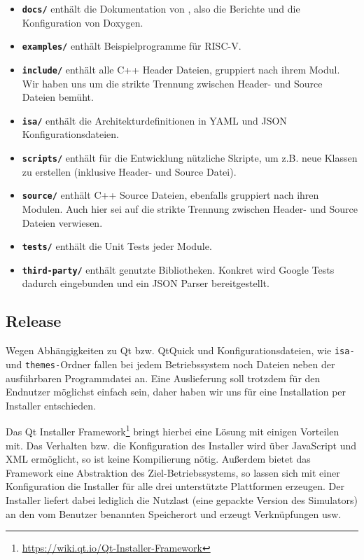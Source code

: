 \begin{itemize}
	\item \textbf{\texttt{docs/}} enthält die Dokumentation von \erasim{}, also
	die Berichte und die Konfiguration von Doxygen.
	\item \textbf{\texttt{examples/}} enthält Beispielprogramme für RISC-V.
	\item \textbf{\texttt{include/}} enthält alle C++ Header Dateien, gruppiert
	nach ihrem Modul. Wir haben uns um die strikte Trennung zwischen Header- und
	Source Dateien bemüht.
	\item \textbf{\texttt{isa/}} enthält die Architekturdefinitionen in YAML und
	JSON Konfigurationsdateien.
	\item \textbf{\texttt{scripts/}} enthält für die Entwicklung nützliche
	Skripte, um z.B. neue Klassen zu erstellen (inklusive Header- und
	Source Datei).
	\item \textbf{\texttt{source/}} enthält C++ Source Dateien, ebenfalls
	gruppiert nach ihren Modulen. Auch hier sei auf die strikte Trennung
	zwischen Header- und Source Dateien verwiesen.
	\item \textbf{\texttt{tests/}} enthält die Unit Tests jeder Module.
	\item \textbf{\texttt{third-party/}} enthält genutzte Bibliotheken. Konkret
	wird Google Tests dadurch eingebunden und ein JSON Parser bereitgestellt.
\end{itemize}

\subsection{Release}
Wegen Abhängigkeiten zu Qt bzw. QtQuick und Konfigurationsdateien, wie \texttt{isa-} und \texttt{themes-}Ordner fallen bei jedem Betriebssystem noch Dateien neben der ausführbaren Programmdatei an. Eine Auslieferung soll trotzdem für den Endnutzer möglichst einfach sein, daher haben wir uns für eine Installation per Installer entschieden.

Das Qt Installer Framework\footnote{\url{https://wiki.qt.io/Qt-Installer-Framework}} bringt hierbei eine Lösung mit einigen Vorteilen mit. Das Verhalten bzw. die Konfiguration des Installer wird über JavaScript und XML ermöglicht, so ist keine Kompilierung nötig. Außerdem bietet das Framework eine Abstraktion des Ziel-Betriebssystems, so lassen sich mit einer Konfiguration die Installer für alle drei unterstützte Plattformen erzeugen. Der Installer liefert dabei lediglich die Nutzlast (eine gepackte Version des Simulators) an den vom Benutzer benannten Speicherort und erzeugt Verknüpfungen usw.

